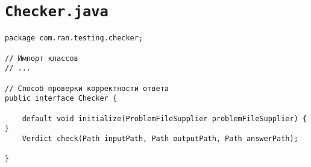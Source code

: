 \section*{\texttt{Checker.java}}
\begin{verbatim}
package com.ran.testing.checker;

// Импорт классов
// ...

// Способ проверки корректности ответа
public interface Checker {

    default void initialize(ProblemFileSupplier problemFileSupplier) { }
    Verdict check(Path inputPath, Path outputPath, Path answerPath);

}
\end{verbatim}